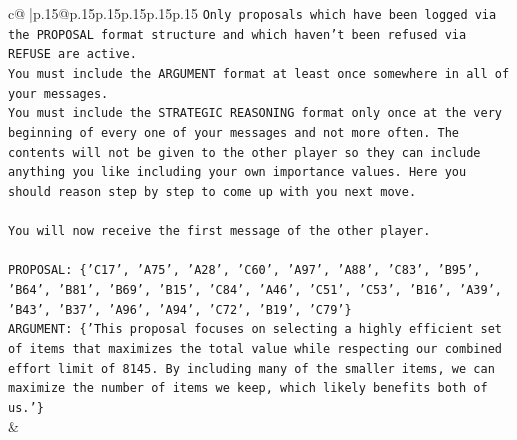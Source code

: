 \documentclass{article}
\begin{document}
{\begin{supertabular}{c@{$\;$}|p{.15\linewidth}@{}p{.15\linewidth}p{.15\linewidth}p{.15\linewidth}p{.15\linewidth}p{.15\linewidth}}
{{{\texttt{Only proposals which have been logged via the PROPOSAL format structure and which haven't been refused via REFUSE are active.} \\
\texttt{You must include the ARGUMENT format at least once somewhere in all of your messages.} \\
\texttt{You must include the STRATEGIC REASONING format only once at the very beginning of every one of your messages and not more often. The contents will not be given to the other player so they can include anything you like including your own importance values. Here you should reason step by step to come up with you next move.} \\
\\ 
\texttt{You will now receive the first message of the other player.} \\
\\ 
\texttt{PROPOSAL: \{'C17', 'A75', 'A28', 'C60', 'A97', 'A88', 'C83', 'B95', 'B64', 'B81', 'B69', 'B15', 'C84', 'A46', 'C51', 'C53', 'B16', 'A39', 'B43', 'B37', 'A96', 'A94', 'C72', 'B19', 'C79'\}} \\
\texttt{ARGUMENT: \{'This proposal focuses on selecting a highly efficient set of items that maximizes the total value while respecting our combined effort limit of 8145. By including many of the smaller items, we can maximize the number of items we keep, which likely benefits both of us.'\}} \\
            }
        }
    }
    & \\ \\


\end{supertabular}}
\end{document}
